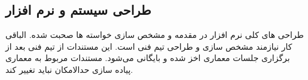 \subsection{طراحی سیستم و نرم افزار}
طراحی های کلی نرم افزار در مقدمه و مشخص سازی خواسته ها صحبت شده. الباقی کار نیازمند مشخص سازی و طراحی تیم فنی است. این مستندات از تیم فنی بعد از 
برگزاری جلسات معماری اخز شده و بایگانی می‌شود.
مستندات مربوط به معماری پیاده سازی حدالامکان نباید تغییر کند.


